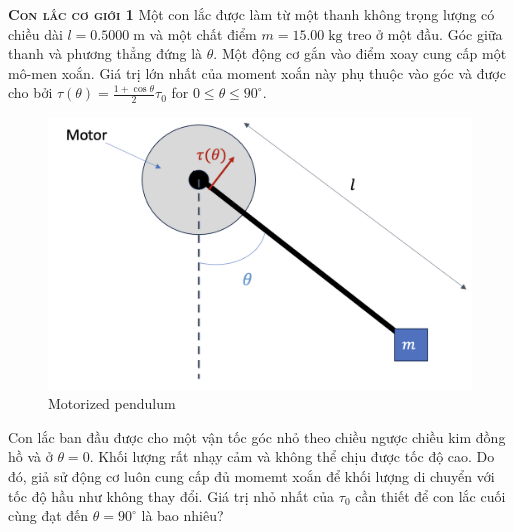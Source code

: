 \begin{problem}
\textbf{\textsc{Con lắc cơ giới 1}}
Một con lắc được làm từ một thanh không trọng lượng có chiều dài $l=0.5000\;\mathrm{m}$ và một chất điểm $m=15.00\;\mathrm{kg}$ treo ở một đầu. Góc giữa thanh và phương thẳng đứng là $\theta$. Một động cơ gắn vào điểm xoay cung cấp một mô-men xoắn. Giá trị lớn nhất của moment xoắn này phụ thuộc vào góc và được cho bởi $\tau (\theta)=\frac{1+\cos\theta}{2} \tau_0$ for $0\leq \theta \leq 90^{\circ}$.

\begin{figure}[h]
    \centering
    \includegraphics[width=0.5\linewidth]{problems/figures/mot_pend.png}
    \caption{Motorized pendulum}
    \label{fig:enter-label}
\end{figure}

Con lắc ban đầu được cho một vận tốc góc nhỏ theo chiều ngược chiều kim đồng hồ và ở $\theta = 0$. Khối lượng rất nhạy cảm và không thể chịu được tốc độ cao. Do đó, giả sử động cơ luôn cung cấp đủ momemt xoắn để khối lượng di chuyển với tốc độ hầu như không thay đổi. Giá trị nhỏ nhất của $\tau_0$ cần thiết để con lắc cuối cùng đạt đến $\theta=90^{\circ}$ là bao nhiêu?


\end{problem}
